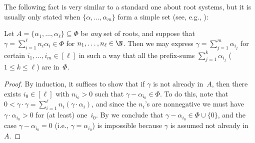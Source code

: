 \documentclass[11pt]{article}
\begin{document}
The following fact is very similar to a standard one about root systems, but it is usually only stated when $\{\alpha, \dots, \alpha_m\}$ form a simple set (see, e.g., \cite[Lem.~3.6.2]{Car89}):
\begin{fact}    \label{fact:prefixsum}
    Let $A = \{\alpha_1, \dots, \alpha_\ell\} \subseteq \Phi$ be \emph{any} set of roots, and suppose that $\gamma = \sum_{i=1}^\ell n_i \alpha_i \in \Phi$ for $n_1, \dots, n_\ell \in \N$.
    Then we may express $\gamma = \sum_{j=1}^m \alpha_{i_j}$ for certain $i_1, \dots, i_m \in [\ell]$ in such a way that all the prefix-sums $\sum_{j=1}^k \alpha_{i_j}$ ($1 \leq k \leq \ell$) are in~$\Phi$.
\end{fact}
\begin{proof}
    By induction, it suffices to show that if $\gamma$ is not already in~$A$, then there exists $i_0 \in [\ell]$ with $n_{i_0} > 0$ such that $\gamma - \alpha_{i_0} \in \Phi$.
    To do this, note that $0 < \gamma \cdot \gamma = \sum_{i=1}^\ell  n_i (\gamma \cdot \alpha_i)$, and since the $n_i$'s are nonnegative we must have $\gamma \cdot \alpha_{i_0} > 0$ for (at least) one~$i_0$.
    By  we conclude that $\gamma - \alpha_{i_0} \in \Phi \cup \{0\}$, and the case $\gamma - \alpha_{i_0} = 0$ (i.e., $\gamma = \alpha_{i_0}$) is impossible because $\gamma$ is assumed not already in~$A$.
\end{proof}
\end{document}
